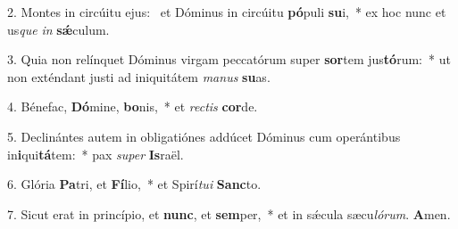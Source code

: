 2. Montes in circúitu ejus: \dag\  et Dóminus in circúitu \textbf{pó}puli \textbf{su}i,~*  ex hoc nunc et us\textit{que} \textit{in} \textbf{sǽ}culum.\

3. Quia non relínquet Dóminus virgam peccatórum super \textbf{sor}tem jus\textbf{tó}rum:~*  ut non exténdant justi ad iniquitátem \textit{ma}\textit{nus} \textbf{su}as.\

4. Bénefac, \textbf{Dó}mine, \textbf{bo}nis,~*  et \textit{rec}\textit{tis} \textbf{cor}de.\

5. Declinántes autem in obligatiónes addúcet Dóminus cum operántibus in\textbf{i}qui\textbf{tá}tem:~*  pax \textit{su}\textit{per} \textbf{Is}raël.\

6. Glória \textbf{Pa}tri, et \textbf{Fí}lio,~*  et Spirí\textit{tu}\textit{i} \textbf{Sanc}to.\

7. Sicut erat in princípio, et \textbf{nunc}, et \textbf{sem}per,~*  et in sǽcula sæcu\textit{ló}\textit{rum}. \textbf{A}men.\

